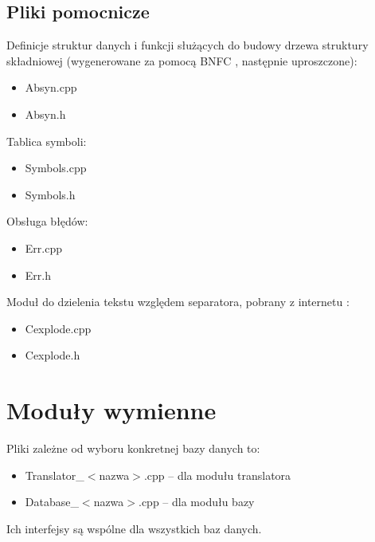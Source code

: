 \subsection{Pliki pomocnicze}
Definicje struktur danych i funkcji służących do budowy drzewa struktury składniowej (wygenerowane za pomocą BNFC \cite{bnfc}, 
następnie uproszczone):
\begin{itemize}
 \item Absyn.cpp
 \item Absyn.h
\end{itemize}
Tablica symboli:
\begin{itemize}
 \item Symbols.cpp
\item Symbols.h
\end{itemize}
Obsługa błędów:
\begin{itemize}
 \item Err.cpp
\item Err.h
\end{itemize}
Moduł do dzielenia tekstu względem separatora, pobrany z internetu \cite{cexplode}:
\begin{itemize}
 \item Cexplode.cpp
 \item Cexplode.h
\end{itemize}


\section{Moduły wymienne}
Pliki zależne od wyboru konkretnej bazy danych to:
\begin{itemize}
 \item Translator\_$<$nazwa$>$.cpp -- dla modułu translatora
\item Database\_$<$nazwa$>$.cpp -- dla modułu bazy
\end{itemize}
Ich interfejsy są wspólne dla wszystkich baz danych.
